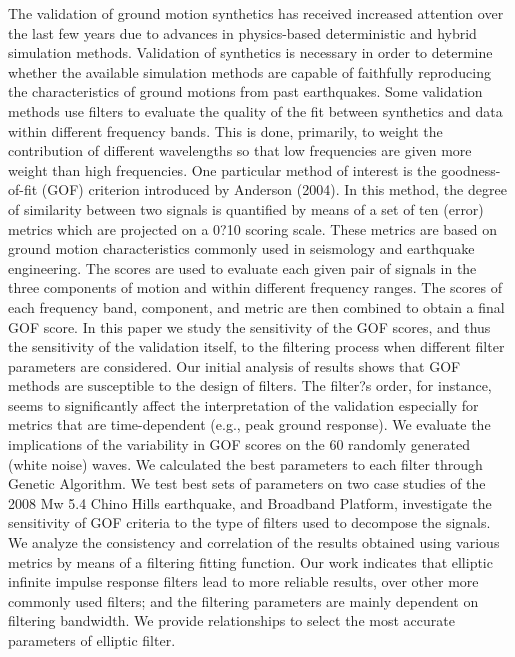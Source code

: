 % 
The validation of ground motion synthetics has received increased attention over the last few years due to advances in physics-based deterministic and hybrid simulation methods. Validation of synthetics is necessary in order to determine whether the available simulation methods are capable of faithfully reproducing the characteristics of ground motions from past earthquakes. Some validation methods use filters to evaluate the quality of the fit between synthetics and data within different frequency bands. This is done, primarily, to weight the contribution of different wavelengths so that low frequencies are given more weight than high frequencies. One particular method of interest is the goodness-of-fit (GOF) criterion introduced by Anderson (2004). In this method, the degree of similarity between two signals is quantified by means of a set of ten (error) metrics which are projected on a 0?10 scoring scale. These metrics are based on ground motion characteristics commonly used in seismology and earthquake engineering. The scores are used to evaluate each given pair of signals in the three components of motion and within different frequency ranges. The scores of each frequency band, component, and metric are then combined to obtain a final GOF score. In this paper we study the sensitivity of the GOF scores, and thus the sensitivity of the validation itself, to the filtering process when different filter parameters are considered. Our initial analysis of results shows that GOF methods are susceptible to the design of filters. The filter?s order, for instance, seems to significantly affect the interpretation of the validation especially for metrics that are time-dependent (e.g., peak ground response). We evaluate the implications of the variability in GOF scores on the 60 randomly generated (white noise) waves. We calculated the best parameters to each filter through Genetic Algorithm. We test best sets of parameters on two case studies of the 2008 Mw 5.4 Chino Hills earthquake, and Broadband Platform, investigate the sensitivity of GOF criteria to the type of filters used to decompose the signals. We analyze the consistency and correlation of the results obtained using various metrics by means of a filtering fitting function. Our work indicates that elliptic infinite impulse response filters lead to more reliable results, over other more commonly used filters; and the filtering parameters are mainly dependent on filtering bandwidth. We provide relationships to select the most accurate parameters of elliptic filter.